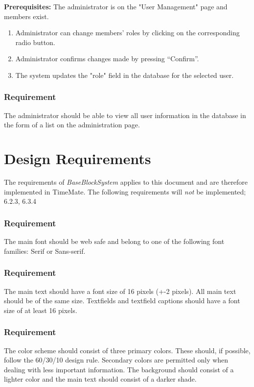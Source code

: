 \documentclass{article}
\begin{document}
\textbf{Prerequisites:} The administrator is on the "User Management" page and members exist.

\begin{enumerate}
    \item Administrator can change members' roles by clicking on the corresponding radio button.
    \item Administrator confirms changes made by pressing “Confirm”.
    \item The system updates the "role" field in the database for the selected user.
    
\end{enumerate}

\subsubsection{Requirement}
The administrator should be able to view all user information in the database in the form of a list on the administration page. 

\section{Design Requirements}
\item The requirements of \emph{BaseBlockSystem} applies to this document and are therefore implemented in TimeMate. The following requirements will \emph{not} be implemented; 6.2.3, 6.3.4

\subsubsection{Requirement}
The main font should be web safe and belong to one of the following font
families: Serif or Sans-serif.
\subsubsection{Requirement}
The main text should have a font size of 16 pixels (+-2 pixels). All main
text should be of the same size.
Textfields and textfield captions should have a font size of at least 16
pixels.
\subsubsection{Requirement}
The color scheme should consist of three primary colors. These should, if
possible, follow the 60/30/10 design rule. Secondary colors are permitted
only when dealing with less important information.
The background should consist of a lighter color and the main text should
consist of a darker shade.
\end{document}
